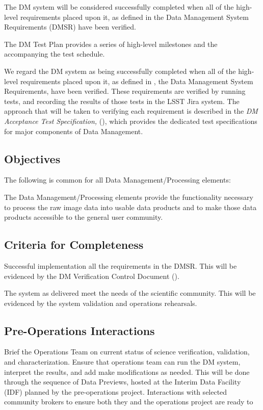 The DM system will be considered successfully completed when all of the high-level requirements placed upon it, as defined in  the Data Management System Requirements (DMSR) have been verified. 

The DM Test Plan provides a series of high-level milestones and the accompanying the test schedule. 

We regard the DM system as being successfully completed when all of the high-level requirements placed upon it, as defined in , the Data Management System Requirements,  have been verified.  These requirements are verified by running tests, and recording the results of those tests in the LSST Jira system.  The approach that will be taken to verifying each requirement is described in the {\it DM Acceptance Test Specification,} (), which provides the dedicated test specifications for major components of Data Management.


\subsection{Objectives}
The following is common for all Data Management/Processing elements:

The Data Management/Processing elements provide the functionality necessary to process the raw image data into usable data products and to make those data products accessible to the general user community.

\subsection{Criteria for Completeness} 
Successful implementation all the requirements in the DMSR. 
This will be evidenced by the DM Verification Control Document ().

The system as delivered meet the needs of the scientific community. 
This will be evidenced by the system validation and operations rehearsals. 

\subsection{Pre-Operations Interactions}

Brief the Operations Team on current status of science verification, validation, and characterization.
Ensure that operations team can run the DM system, interpret the results, and add make modifications as needed. 
This will be done through the sequence of Data Previews,  hosted at the Interim Data Facility (IDF) planned by the pre-operations project. 
Interactions with selected community brokers to ensure both they and the operations project are ready to 

